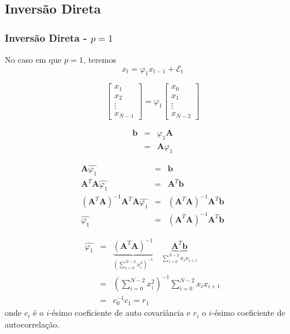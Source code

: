 \subsection{Inversão Direta}
\begin{frame}[allowframebreaks]
  \frametitle{Inversão Direta - $p=1$}
  No caso em que $p=1$, teremos
  \begin{equation}
        x_{t} = \varphi_1 x_{t-1} + \mathcal{E}_t
  \end{equation}

  \begin{equation}
  \begin{bmatrix} x_1 \\ x_2 \\ \vdots \\ x_{N-1}\end{bmatrix}
  = \varphi_1 \begin{bmatrix} x_0 \\ x_1 \\ \vdots \\ x_{N-2}\end{bmatrix} 
  \end{equation}
  
  \begin{eqnarray}
  \mathbf{b} &=& \varphi_1 \mathbf{A} \nonumber \\
             &=& \mathbf{A} \varphi_1
  \end{eqnarray}
 
  \framebreak 
  \begin{eqnarray}
  \mathbf{A} \hat{\varphi_1} &=& \mathbf{b} \nonumber \\
  \mathbf{A}^T \mathbf{A} \hat{\varphi_1} &=& \mathbf{A}^T \mathbf{b} \nonumber \\
  (\mathbf{A}^T \mathbf{A})^{-1} \mathbf{A}^T \mathbf{A} \hat{\varphi_1} &=& (\mathbf{A}^T \mathbf{A})^{-1} \mathbf{A}^T \mathbf{b} \nonumber \\
  \hat{\varphi_1} &=& (\mathbf{A}^T \mathbf{A})^{-1} \mathbf{A}^T \mathbf{b} 
  \end{eqnarray}
  
  \vspace{-4ex}
  \begin{eqnarray}
  \hat{\varphi_1} &=& \underbrace{(\mathbf{A}^T \mathbf{A})^{-1}}_{\left( \sum_{i=0}^{N-2} x_i^2 \right)^{-1} } \quad \underbrace{\mathbf{A}^T \mathbf{b}}_{\sum_{i=0}^{N-2}x_i x_{i+1}} \nonumber \\
  &=& \left( \sum_{i=0}^{N-2} x_i^2 \right)^{-1} \sum_{i=0}^{N-2}x_i x_{i+1} \nonumber \\
  &=& c_0^{-1} c_1 = r_1
  \end{eqnarray}
  onde $c_i$ é o $i$-ésimo coeficiente de auto covariância e $r_i$ o $i$-ésimo
  coeficiente de autocorrelação.
\end{frame}

